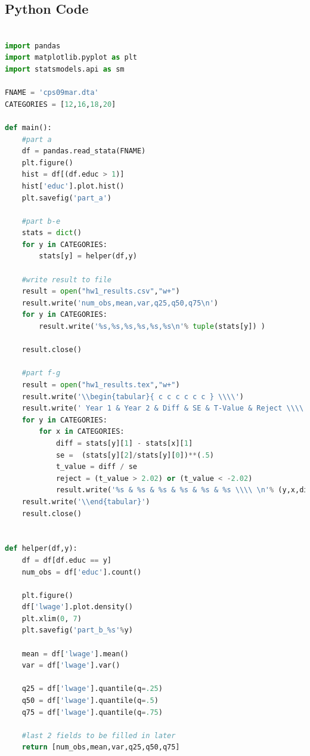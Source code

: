 \documentclass{article}
\begin{document}
\begin{enumerate}[label=\alph*)]




\section{Python Code}

\begin{lstlisting}[language=Python]

import pandas
import matplotlib.pyplot as plt
import statsmodels.api as sm

FNAME = 'cps09mar.dta'
CATEGORIES = [12,16,18,20]

def main():
	#part a
	df = pandas.read_stata(FNAME)
	plt.figure()
	hist = df[(df.educ > 1)]
	hist['educ'].plot.hist()
	plt.savefig('part_a')

	#part b-e
	stats = dict()
	for y in CATEGORIES:
		stats[y] = helper(df,y)

	#write result to file
	result = open("hw1_results.csv","w+")
	result.write('num_obs,mean,var,q25,q50,q75\n')
	for y in CATEGORIES:
		result.write('%s,%s,%s,%s,%s,%s\n'% tuple(stats[y]) )

	result.close()

	#part f-g
	result = open("hw1_results.tex","w+")
	result.write('\\begin{tabular}{ c c c c c c } \\\\')
	result.write(' Year 1 & Year 2 & Diff & SE & T-Value & Reject \\\\ \n \hline \n')
	for y in CATEGORIES:
		for x in CATEGORIES:
			diff = stats[y][1] - stats[x][1]
			se =  (stats[y][2]/stats[y][0])**(.5)
			t_value = diff / se
			reject = (t_value > 2.02) or (t_value < -2.02)
			result.write('%s & %s & %s & %s & %s & %s \\\\ \n'% (y,x,diff,se,t_value,reject) )
	result.write('\\end{tabular}')
	result.close()


def helper(df,y):
	df = df[df.educ == y]
	num_obs = df['educ'].count()

	plt.figure()
	df['lwage'].plot.density()
	plt.xlim(0, 7)
	plt.savefig('part_b_%s'%y)
	
	mean = df['lwage'].mean()
	var = df['lwage'].var()
	
	q25 = df['lwage'].quantile(q=.25)
	q50 = df['lwage'].quantile(q=.5)
	q75 = df['lwage'].quantile(q=.75)

	#last 2 fields to be filled in later
	return [num_obs,mean,var,q25,q50,q75]



\end{lstlisting}
\end{enumerate}
\end{document}
